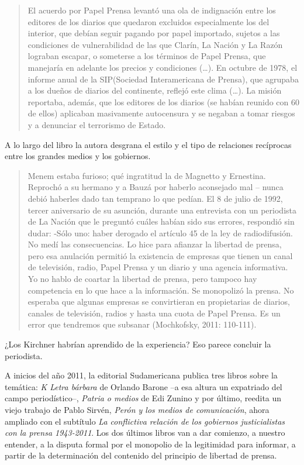 \begin{quote}
El acuerdo por Papel Prensa levantó una ola de indignación entre los editores de los diarios que quedaron excluidos especialmente los del interior, que debían seguir pagando por papel importado, sujetos a las condiciones de vulnerabilidad de las que Clarín, La Nación y La Razón lograban escapar, o someterse a los términos de Papel Prensa, que manejaría en adelante los precios y condiciones (\ldots). En octubre de 1978, el informe anual de la SIP(Sociedad Interamericana de Prensa), que agrupaba a los dueños de diarios del continente, reflejó este clima (\ldots). La misión reportaba, además, que los editores de los diarios (se habían reunido con 60 de ellos) aplicaban masivamente autocensura y se negaban a tomar riesgos y a denunciar el terrorismo de Estado.
\end{quote}

A lo largo del libro la autora desgrana el estilo y el tipo de relaciones recíprocas entre los grandes medios y los gobiernos.

\begin{quote}
Menem estaba furioso; qué ingratitud la de Magnetto y Ernestina. Reprochó a su hermano y a Bauzá por haberlo aconsejado mal -- nunca debió haberles dado tan temprano lo que pedían. El 8 de julio de 1992, tercer aniversario de su asunción, durante una entrevista con un periodista de La Nación que le preguntó cuáles habían sido sus errores, respondió sin dudar: -Sólo uno: haber derogado el artículo 45 de la ley de radiodifusión. No medí las consecuencias. Lo hice para afianzar la libertad de prensa, pero esa anulación permitió la existencia de empresas que tienen un canal de televisión, radio, Papel Prensa y un diario y una agencia informativa. Yo no hablo de coartar la libertad de prensa, pero tampoco hay competencia en lo que hace a la información. Se monopolizó la prensa. No esperaba que algunas empresas se convirtieran en propietarias de diarios, canales de televisión, radios y hasta una cuota de Papel Prensa. Es un error que tendremos que subsanar (Mochkofsky, 2011: 110-111).
\end{quote}

¿Los Kirchner habrían aprendido de la experiencia? Eso parece concluir la periodista.

A inicios del año 2011, la editorial Sudamericana publica tres libros sobre la temática: \emph{K Letra bárbara} de Orlando Barone --a esa altura un expatriado del campo periodístico--, \emph{Patria o medios} de Edi Zunino y por último, reedita un viejo trabajo de Pablo Sirvén, \emph{Perón y los medios de comunicación}, ahora ampliado con el subtítulo \emph{La conflictiva relación de los gobiernos justicialistas con la prensa 1943-2011}. Los dos últimos libros van a dar comienzo, a nuestro entender, a la disputa formal por el monopolio de la legitimidad para informar, a partir de la determinación del contenido del principio de libertad de prensa.

